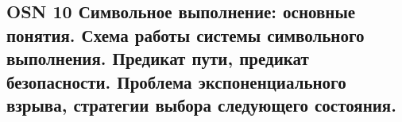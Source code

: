 \subsection{OSN 10 Символьное выполнение: основные понятия. Схема работы системы
символьного выполнения. Предикат пути, предикат безопасности. Проблема
экспоненциального взрыва, стратегии выбора следующего состояния.}

